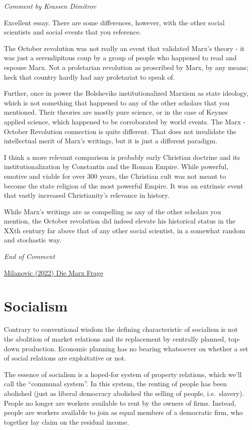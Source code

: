 \documentclass[
]{book}
\begin{document}
\emph{Comment by Krassen Dimitrov}

Excellent essay. There are some differences, however, with the other social scientists and social events that you reference.

The October revolution was not really an event that validated Marx's theory - it was just a serendipitous coup by a group of people who happened to read and espouse Marx. Not a proletarian revolution as proscribed by Marx, by any means; heck that country hardly had any proletariat to speak of.

Further, once in power the Bolsheviks institutionalized Marxism as state ideology, which is not something that happened to any of the other scholars that you mentioned. Their theories are mostly pure science, or in the case of Keynes applied science, which happened to be corroborated by world events. The Marx - October Revolution connection is quite different. That does not invalidate the intellectual merit of Marx's writings, but it is just a different paradigm.

I think a more relevant comparison is probably early Christian doctrine and its institutionalization by Constantin and the Roman Empire. While powerful, emotive and viable for over 300 years, the Christian cult was not meant to become the state religion of the most powerful Empire. It was an extrinsic event that vastly increased Christianity's relevance in history.

While Marx's writings are as compelling as any of the other scholars you mention, the October revolution did indeed elevate his historical status in the XXth century far above that of any other social scientist, in a somewhat random and stochastic way.

\emph{End of Comment}

\href{https://branko2f7.substack.com/p/die-karl-marx-frage}{Milanovic (2022) Die Marx Frage}

\hypertarget{socialism}{%
\chapter{Socialism}\label{socialism}}

Contrary to conventional wisdom the defining characteristic of socialism is not the abolition of market relations and its replacement by centrally planned, top-down production. Economic planning has no bearing whatsoever on whether a set of social relations are exploitative or not.

The essence of socialism is a hoped-for system of property relations, which we'll call the ``communal system''. In this system, the renting of people has been abolished (just as liberal democracy abolished the selling of people, i.e.~slavery). People no longer are workers available to rent by the owners of firms. Instead, people are workers available to join as equal members of a democratic firm, who together lay claim on the residual income.
\end{document}
